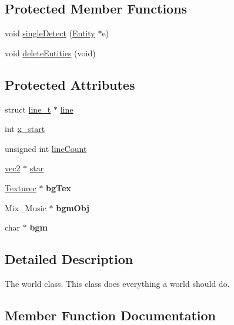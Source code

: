 \subsection*{Protected Member Functions}
\begin{DoxyCompactItemize}
\item 
void \hyperlink{classWorld_a0af69654347b29787877b77020fa0a5a}{single\+Detect} (\hyperlink{classEntity}{Entity} $\ast$e)
\item 
void \hyperlink{classWorld_a1c1e6ea7fd0d84660d2791a256aba382}{delete\+Entities} (void)
\end{DoxyCompactItemize}
\subsection*{Protected Attributes}
\begin{DoxyCompactItemize}
\item 
struct \hyperlink{structline__t}{line\+\_\+t} $\ast$ \hyperlink{classWorld_afd9945f6ede5eabc3ff9243ce2b31247}{line}
\item 
int \hyperlink{classWorld_a645767ccf316a9b4469db773ac111ae4}{x\+\_\+start}
\item 
unsigned int \hyperlink{classWorld_a432e07fd7f7504aaa6ff29408afe0678}{line\+Count}
\item 
\hyperlink{structvec2}{vec2} $\ast$ \hyperlink{classWorld_a4f8b12f8eda220060ec01c0e9a6b9325}{star}
\item 
\hypertarget{classWorld_accebca6a747c3db27916770507aee04c}{}\hyperlink{classTexturec}{Texturec} $\ast$ {\bfseries bg\+Tex}\label{classWorld_accebca6a747c3db27916770507aee04c}

\item 
\hypertarget{classWorld_a7ca21c1e62a53cf7024801623aa46325}{}Mix\+\_\+\+Music $\ast$ {\bfseries bgm\+Obj}\label{classWorld_a7ca21c1e62a53cf7024801623aa46325}

\item 
\hypertarget{classWorld_ad8269981b3846aa44b721cdeda30911c}{}char $\ast$ {\bfseries bgm}\label{classWorld_ad8269981b3846aa44b721cdeda30911c}

\end{DoxyCompactItemize}


\subsection{Detailed Description}
The world class. This class does everything a world should do. 

\subsection{Member Function Documentation}
\hypertarget{classWorld_a1c1e6ea7fd0d84660d2791a256aba382}{}
